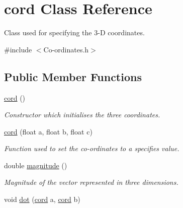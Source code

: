 \hypertarget{classcord}{\section{cord Class Reference}
\label{classcord}
}


Class used for specifying the 3-\/\-D coordinates.  




{\ttfamily \#include $<$Co-\/ordinates.\-h$>$}

\subsection*{Public Member Functions}
\begin{DoxyCompactItemize}
\item 
\hypertarget{classcord_a0c44bdfe6418202c45b2ac0c5340c289}{\hyperlink{classcord_a0c44bdfe6418202c45b2ac0c5340c289}{cord} ()}\label{classcord_a0c44bdfe6418202c45b2ac0c5340c289}

\begin{DoxyCompactList}\small\item\em Constructor which initialises the three coordinates. \end{DoxyCompactList}\item 
\hypertarget{classcord_ab2869dcd7a26ad6e892a14bd1b92916d}{\hyperlink{classcord_ab2869dcd7a26ad6e892a14bd1b92916d}{cord} (float a, float b, float c)}\label{classcord_ab2869dcd7a26ad6e892a14bd1b92916d}

\begin{DoxyCompactList}\small\item\em Function used to set the co-\/ordinates to a specifies value. \end{DoxyCompactList}\item 
\hypertarget{classcord_a2eb61a9406f8a9a106b8d9208e0a9fc3}{double \hyperlink{classcord_a2eb61a9406f8a9a106b8d9208e0a9fc3}{magnitude} ()}\label{classcord_a2eb61a9406f8a9a106b8d9208e0a9fc3}

\begin{DoxyCompactList}\small\item\em Magnitude of the vector represented in three dimensions. \end{DoxyCompactList}\item 
\hypertarget{classcord_a7432aa3caa6e6097369bb9eaf085cd8c}{void \hyperlink{classcord_a7432aa3caa6e6097369bb9eaf085cd8c}{dot} (\hyperlink{classcord}{cord} a, \hyperlink{classcord}{cord} b)}\label{classcord_a7432aa3caa6e6097369bb9eaf085cd8c}


\end{DoxyCompactItemize}
